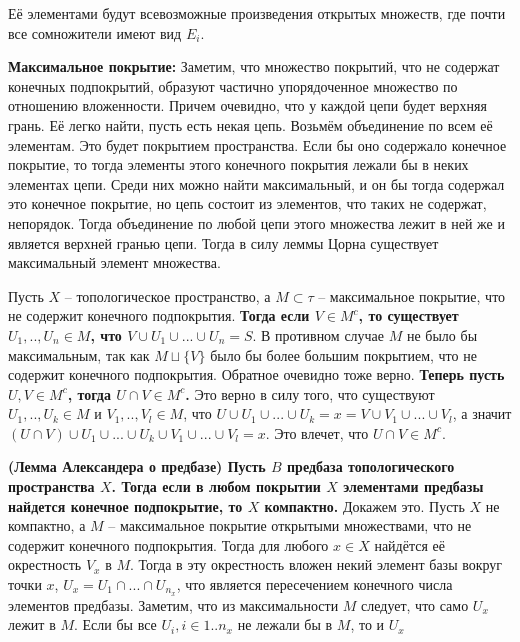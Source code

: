 \documentclass{article}
\begin{document}
\begin{enumerate}
        Её элементами будут всевозможные произведения открытых множеств, где
        почти все сомножители имеют вид $E_i$.\par
        \textbf{Максимальное покрытие:} Заметим, что множество покрытий, что не
        содержат конечных подпокрытий, образуют частично упорядоченное множество
        по отношению вложенности. Причем очевидно, что у каждой цепи будет
        верхняя грань. Её легко найти, пусть есть некая цепь. Возьмём
        объединение по всем её элементам. Это будет покрытием пространства.
        Если бы оно содержало конечное покрытие, то тогда элементы этого
        конечного покрытия лежали бы в неких элементах цепи. Среди них
        можно найти максимальный, и он бы тогда содержал это конечное покрытие,
        но цепь состоит из элементов, что таких не содержат, непорядок. Тогда
        объединение по любой цепи этого множества лежит в ней же и является
        верхней гранью цепи. Тогда в силу леммы Цорна существует максимальный
        элемент множества.\par
        Пусть $X$ – топологическое пространство, а $M\subset \tau$ –
        максимальное покрытие, что не содержит конечного подпокрытия.\textbf{
        Тогда если $V\in M^c$, то существует $U_1, .., U_n\in M$, что $V\cup
        U_1 \cup ...\cup U_n = S$}. В противном случае $M$ не было бы
        максимальным, так как $M\sqcup\{V\}$ было бы более большим покрытием,
        что не содержит конечного подпокрытия. Обратное очевидно тоже верно.
        \textbf{Теперь пусть $U, V\in M^c$, тогда $U\cap V\in M^c$.} Это верно
        в силу того, что существуют $U_1, .., U_k\in M$ и $V_1, .., V_l\in M$,
        что $U\cup U_1\cup ...\cup U_k=x=V\cup V_1\cup ...\cup V_l$, а значит
        $(U\cap V)\cup U_1\cup ...\cup U_k\cup V_1\cup ...\cup V_l=x$. Это
        влечет, что $U\cap V\in M^c$.\par
        \textbf{(Лемма Александера о предбазе) Пусть $B$ предбаза
        топологического пространства $X$. Тогда если в любом покрытии $X$
        элементами предбазы найдется конечное подпокрытие, то $X$ компактно.}
        Докажем это. Пусть $X$ не компактно, а $M$ – максимальное покрытие
        открытыми множествами, что не содержит конечного подпокрытия. Тогда для
        любого $x\in X$ найдётся её окрестность $V_x$ в $M$. Тогда в эту
        окрестность вложен некий элемент базы вокруг точки $x$, $U_x=U_1\cap...
        \cap U_{n_x}$, что является пересечением конечного числа элементов
        предбазы. Заметим, что из максимальности $M$ следует, что само $U_x$
        лежит в $M$. Если бы все $U_i,i\in1..n_x$ не лежали бы в $M$, то и $U_x$

\end{enumerate}
\end{document}
